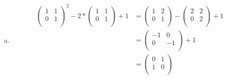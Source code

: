 \documentclass{article}
\begin{document}
\begin{enumerate}[(i)]
\begin{enumerate}[a)]
  \item
    \begin{align*}
      \left(
        \begin{array}{cc}
          1 & 1 \\
          0 & 1 \\
        \end{array}
      \right)^2
      - 2 *
      \left(
        \begin{array}{cc}
          1 & 1 \\
          0 & 1 \\
        \end{array}
      \right)
      + 1
      &=
      \left(
        \begin{array}{cc}
          1 & 2 \\
          0 & 1 \\
        \end{array}
      \right)
      - 
      \left(
        \begin{array}{cc}
          2 & 2 \\
          0 & 2 \\
        \end{array}
      \right)
      + 1 \\
      &=
      \left(
        \begin{array}{cc}
          -1 & 0 \\
          0 & -1 \\
        \end{array}
      \right)
      + 1 \\
      &=
      \left(
        \begin{array}{cc}
          0 & 1 \\
          1 & 0 \\
        \end{array}
      \right)  
      \\
    \end{align*}
  \end{enumerate}


\end{enumerate}
\end{document}
